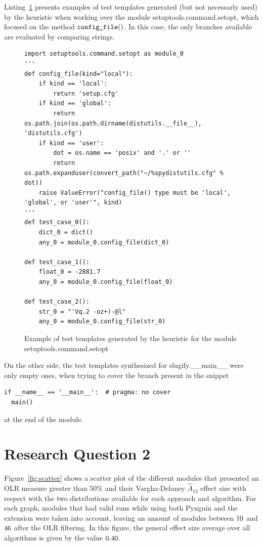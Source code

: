 \documentclass[%
  chapterprefix=false,%
  open=right,%
  twoside=true,%
  paper=a4,%
  logofile={Figures/logo.png},%
  thesistype=master,%
  UKenglish,%
]{se2thesis}
\newcommand{\callable}[2][]{\(\text{\texttt{#2}}(#1)\)}
\begin{document}
Listing~\ref{lst:9} presents examples of test templates generated (but not necessarly used) by the heuristic when working over the module setuptools.command.setopt, which focused on the method \callable[]{config\_file}.
In this case, the only branches available are evaluated by comparing strings.

\begin{figure}
\begin{verbatim}
import setuptools.command.setopt as module_0
'''
def config_file(kind="local"):
    if kind == 'local':
        return 'setup.cfg'
    if kind == 'global':
        return os.path.join(os.path.dirname(distutils.__file__), 'distutils.cfg')
    if kind == 'user':
        dot = os.name == 'posix' and '.' or ''
        return os.path.expanduser(convert_path("~/%spydistutils.cfg" % dot))
    raise ValueError("config_file() type must be 'local', 'global', or 'user'", kind)
'''
def test_case_0():
    dict_0 = dict()
    any_0 = module_0.config_file(dict_0)

def test_case_1():
    float_0 = -2881.7
    any_0 = module_0.config_file(float_0)

def test_case_2():
    str_0 = "'Vq.2 -oz+)-@l"
    any_0 = module_0.config_file(str_0)
\end{verbatim}
\caption{Example of test templates generated by the heuristic for the module setuptools.command.setopt}\label{lst:9}
\end{figure}

On the other side, the test templates synthesized for slugify.\_\_main\_\_ were only empty ones, when trying to cover the branch present in the snippet

\begin{verbatim}
if __name__ == '__main__':  # pragma: no cover
  main()
\end{verbatim}

at the end of the module.

\newpage

\section{Research Question 2}

Figure~\ref{fig:scatter} shows a scatter plot of the different modules that presented an OLR measure greater than \(50\%\) and their Vargha-Delaney \(\hat{A}_{12}\) effect size with respect with the two distributions available for each approach and algorithm.
For each graph, modules that had valid runs while using both Pynguin and the extension were taken into account, leaving an amount of modules between \(10\) and \(46\) after the OLR filtering.
In this figure, the general effect size average over all algorithms is given by the value \(0.40\). 
\end{document}
